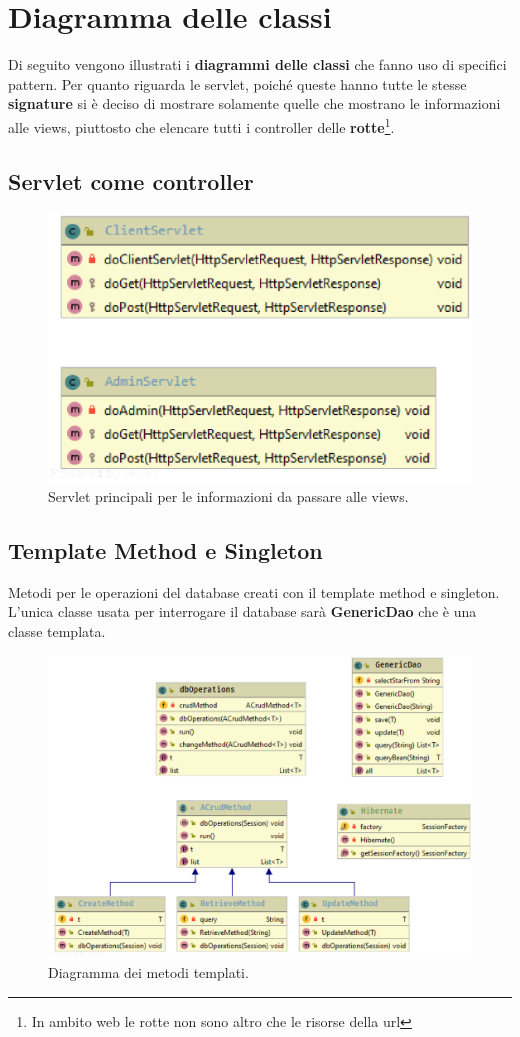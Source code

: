 \chapter{Diagramma delle classi} \label{cap2}
\def\baselinestretch{1.66}
Di seguito vengono illustrati i \textbf{diagrammi delle classi} che fanno uso di specifici pattern. Per quanto riguarda le servlet, poich\'e queste hanno tutte le stesse \textbf{signature} si \`e deciso di mostrare solamente
quelle che mostrano le informazioni alle views, piuttosto che elencare tutti i controller delle
\textbf{rotte}\footnote{In ambito web le rotte non sono altro che le risorse della url}.
\section{Servlet come controller}
\begin{figure}[ht]
    \centering
    \includegraphics[scale=0.6]{img/servlet.eps}
    \caption{Servlet principali per le informazioni da passare alle views.}
\end{figure}
\newpage
\section{Template Method e Singleton}
Metodi per le operazioni del database creati con il template method e singleton. L'unica
classe usata per interrogare il database sar\`a \textbf{GenericDao} che \`e una classe templata.
\begin{figure}[ht]
    \centering
    \includegraphics[scale=0.6]{img/tm.eps}
    \caption{Diagramma dei metodi templati.}
\end{figure}
\newpage

